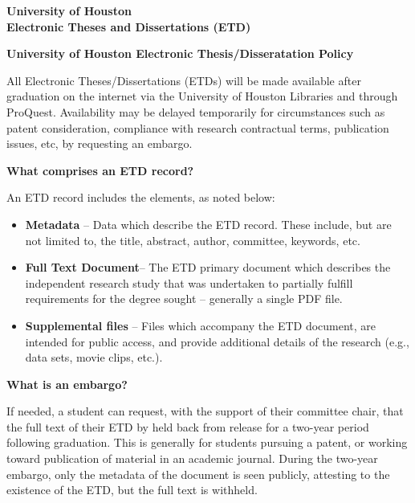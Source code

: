 \documentclass[12pt]{article}
\begin{document}
\begin{center}
    \Large\textbf{University of Houston\\
    Electronic Theses and Dissertations (ETD)}
\end{center}

\bigskip

\begin{center}
    \textbf{University of Houston Electronic Thesis/Disseratation Policy}
\end{center}

\noindent All Electronic Theses/Dissertations (ETDs) will be made available after graduation on the internet via the University of Houston Libraries and through ProQuest. Availability may be delayed temporarily for circumstances such as patent consideration, compliance with research contractual terms, publication issues, etc, by requesting an embargo.

\bigskip

\noindent\textbf{What comprises an ETD record?}

\noindent An ETD record includes the elements, as noted below:

\begin{itemize}
    \item \textbf{Metadata} – Data which describe the ETD record. These include, but are not limited to, the title, abstract, author, committee, keywords, etc.
    \item \textbf{Full Text Document}– The ETD primary document which describes the independent research study that was undertaken to partially fulfill requirements for the degree sought – generally a single PDF file.
    \item \textbf{Supplemental files} – Files which accompany the ETD document, are intended for public access, and provide additional details of the research (e.g., data sets, movie clips, etc.).
\end{itemize}

\bigskip

\noindent\textbf{What is an embargo?}

\noindent If needed, a student can request, with the support of their committee chair, that the full text of their ETD by held back from release for a two-year period following graduation. This is generally for students pursuing a patent, or working toward publication of material in an academic journal. During the two-year embargo, only the metadata of the document is seen publicly, attesting to the existence of the ETD, but the full text is withheld.
\end{document}
